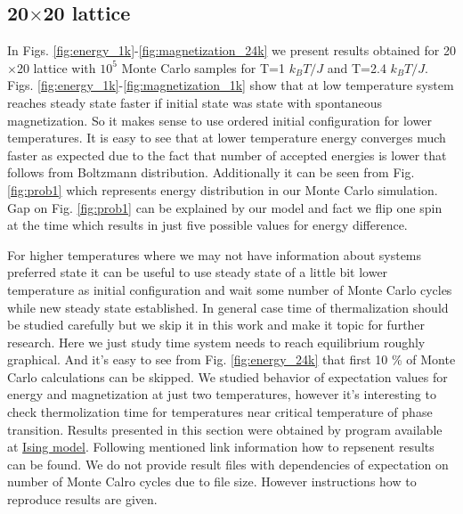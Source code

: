 \documentclass[10pt]{article}
\begin{document}
\subsection{20$\times$20 lattice}
In Figs. \ref{fig:energy_1k}-\ref{fig:magnetization_24k} we present results obtained for 20$\times$20 lattice with $10^5$ Monte Carlo samples for T=1 $k_BT/J$ and T=2.4 $k_BT/J$. Figs. \ref{fig:energy_1k}-\ref{fig:magnetization_1k} show that at low temperature system reaches steady state faster if initial state was state with spontaneous magnetization. So it makes sense to use ordered initial configuration for lower temperatures. 
It is easy to see that at lower temperature energy converges much faster as expected due to the fact that number of accepted energies is lower that follows from Boltzmann distribution. Additionally it can be seen from Fig. \ref{fig:prob1} which represents energy distribution in our Monte Carlo simulation. Gap on Fig. \ref{fig:prob1} can be explained by our model and fact we flip one spin at the time which results in just five possible values for energy difference. 

For higher temperatures where we may not have information about systems preferred state it can be useful to use steady state of a little bit lower temperature as initial configuration and wait some number of Monte Carlo cycles while new steady state established. In general case time of thermalization should be studied carefully but we skip it in this work and make it topic for further research. Here we just study time system needs to reach equilibrium roughly graphical. And it's easy to see from Fig. \ref{fig:energy_24k} that first 10 \% of Monte Carlo calculations can be skipped.
We studied behavior of expectation values for energy and magnetization at just two temperatures, however it's interesting to check thermolization time for temperatures near critical temperature of phase transition. Results presented in this section were obtained by program available at \href{https://github.com/andrei-fys/fys4150/tree/master/Project_4/src/task_d}{Ising model}. Following mentioned link information how to repsenent results can be found. We do not provide result files with dependencies of expectation on number of Monte Calro cycles due to file size. However instructions how to reproduce results are given.
\end{document}

